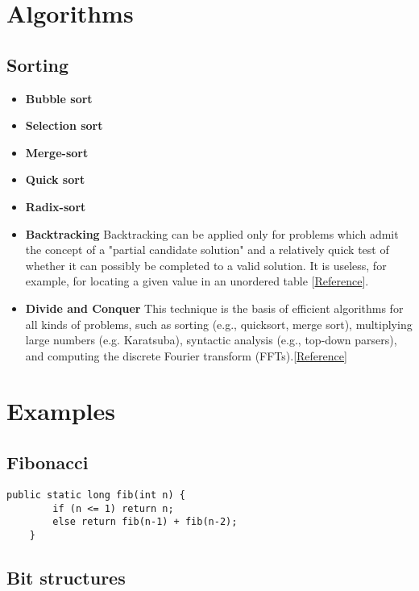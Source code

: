 \documentclass[letterpaper]{article}
\begin{document}
\section{Algorithms}

\subsection{Sorting}
\begin{itemize}
\item{\bf Bubble sort}
\item{\bf Selection sort}
\item{\bf Merge-sort} 

\item{\bf Quick sort}
\item{\bf Radix-sort}
\item{\bf Backtracking } Backtracking can be applied only for problems which admit the concept of a "partial candidate solution" and a relatively quick test of whether it can possibly be completed to a valid solution. It is useless, for example, for locating a given value in an unordered table [\href{http://en.wikipedia.org/wiki/Backtracking}{Reference}]. 
\item{\bf Divide and Conquer} This technique is the basis of efficient algorithms for all kinds of problems, such as sorting (e.g., quicksort, merge sort), multiplying large numbers (e.g. Karatsuba), syntactic analysis (e.g., top-down parsers), and computing the discrete Fourier transform (FFTs).[\href{http://en.wikipedia.org/wiki/Divide_and_conquer_algorithm}{Reference}]

\end{itemize}

\section{Examples}
\subsection{Fibonacci}
\begin{lstlisting}
public static long fib(int n) {
        if (n <= 1) return n;
        else return fib(n-1) + fib(n-2);
    }
    \end{lstlisting}
    
\subsection{Bit structures}
\end{document}
